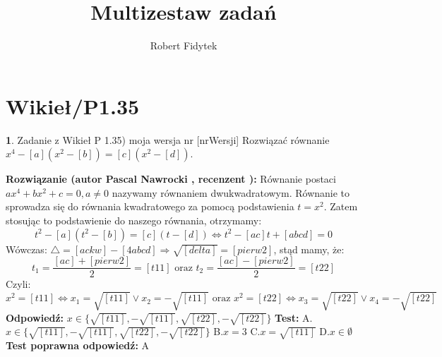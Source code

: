 \documentclass[12pt, a4paper]{article}
\title{Multizestaw zadań}
\author{Robert Fidytek}
\date{}
\theoremstyle{definition} %
\newtheorem{zad}{}
\newcommand{\kategoria}[1]{\section{#1}} %
\newcommand{\zadStart}[1]{\begin{zad}#1\newline} %
\newcommand{\zadStop}{\end{zad}}   %
\newcommand{\rozwStart}[2]{\noindent \textbf{Rozwiązanie (autor #1 , recenzent #2): }\newline} %
\newcommand{\rozwStop}{\newline}                                            %
\newcommand{\odpStart}{\noindent \textbf{Odpowiedź:}\newline}    %
\newcommand{\odpStop}{\newline}                                             %
\newcommand{\testStart}{\noindent \textbf{Test:}\newline} %
\newcommand{\testStop}{\newline} %
\newcommand{\kluczStart}{\noindent \textbf{Test poprawna odpowiedź:}\newline} %
\newcommand{\kluczStop}{\newline} %
\begin{document}
\maketitle


\kategoria{Wikieł/P1.35}
\zadStart{Zadanie z Wikieł P 1.35) moja wersja nr [nrWersji]}
Rozwiązać równanie $x^4-[a](x^2-[b])=[c](x^2-[d])$.
\zadStop
\rozwStart{Pascal Nawrocki}{}
Równanie postaci $ax^4+bx^2+c=0, a\neq0$ nazywamy równaniem dwukwadratowym. Równanie to sprowadza się do równania kwadratowego za pomocą podstawienia $t=x^2$. Zatem stosując to podstawienie do naszego równania, otrzymamy: $$ t^2-[a](t^2-[b])=[c](t-[d])\Leftrightarrow t^2-[ac]t+[abcd]=0$$
Wówczas: $\bigtriangleup=[ackw]-[4abcd]\Rightarrow\sqrt{[delta]}=[pierw2]$, stąd mamy, że:
$$t_1=\frac{[ac]+[pierw2]}{2}=[t11] \text{ oraz } t_2=\frac{[ac]-[pierw2]}{2}=[t22]$$
Czyli:
$$x^2={[t11]}\Leftrightarrow x_1=\sqrt{[t11]} \vee x_2=-\sqrt{[t11]} \text{ oraz } x^2=[t22]\Leftrightarrow x_3=\sqrt{[t22]} \vee x_4=-\sqrt{[t22]}$$
\rozwStop
\odpStart
$x\in\{\sqrt{[t11]},-\sqrt{[t11]},\sqrt{[t22]},-\sqrt{[t22]}\}$
\odpStop
\testStart
A.$x\in\{\sqrt{[t11]},-\sqrt{[t11]},\sqrt{[t22]},-\sqrt{[t22]}\}$
B.$x=3$
C.$x=\sqrt{[t11]}$
D.$x\in \emptyset$
\testStop
\kluczStart
A
\kluczStop
\end{document}
